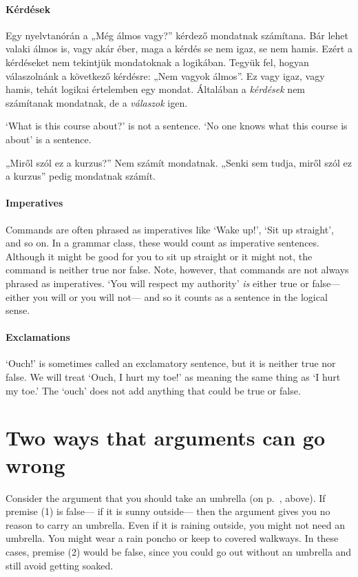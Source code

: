 \paragraph{Kérdések} Egy nyelvtanórán a „Még álmos vagy?” kérdező mondatnak számítana. Bár lehet valaki álmos is, vagy akár éber, maga a kérdés se nem igaz, se nem hamis. Ezért a kérdéseket nem tekintjük  mondatoknak  a logikában. Tegyük fel, hogyan válaszolnánk a következő kérdésre: „Nem vagyok álmos”. Ez vagy igaz, vagy hamis, tehát logikai értelemben egy mondat. Általában a \emph{kérdések} nem számítanak mondatnak, de a \emph{válaszok} igen.


`What is this course about?' is not a sentence. `No one knows what this course is about' is a sentence.



„Miről szól ez a kurzus?” Nem számít mondatnak. „Senki sem tudja, miről szól ez a kurzus” pedig mondatnak számít.



\paragraph{Imperatives} Commands are often phrased as imperatives like `Wake up!', `Sit up straight', and so on. In a grammar class, these would count as imperative sentences. Although it might be good for you to sit up straight or it might not, the command is neither true nor false. Note, however, that commands are not always phrased as imperatives. `You will respect my authority' \emph{is} either true or false--- either you will or you will not--- and so it counts as a sentence in the logical sense.

\paragraph{Exclamations} `Ouch!' is sometimes called an exclamatory sentence, but it is neither true nor false. We will treat `Ouch, I hurt my toe!' as meaning the same thing as `I hurt my toe.' The `ouch' does not add anything that could be true or false.




\section{Two ways that arguments can go wrong}
Consider the argument that you should take an umbrella (on p.~\pageref{argRaining}, above). If premise (1) is false--- if it is sunny outside--- then the argument gives you no reason to carry an umbrella. Even if it is raining outside, you might not need an umbrella. You might wear a rain poncho or keep to covered walkways. In these cases, premise (2) would be false, since you could go out without an umbrella and still avoid getting soaked.

